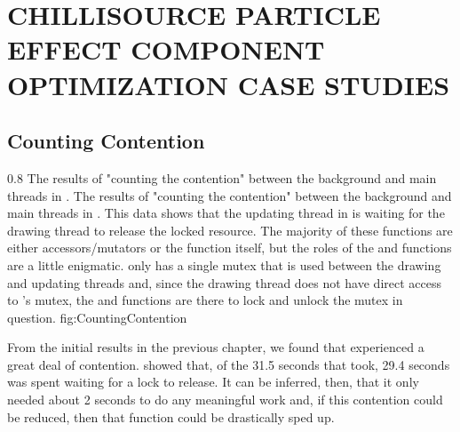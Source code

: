 

\chapter{CHILLISOURCE PARTICLE EFFECT COMPONENT OPTIMIZATION CASE STUDIES}\label{ch:case_studies}

\section{Counting Contention}\label{sec:studies_counting_contention}

{0.8}
{The results of "counting the contention" between the background and main threads in .}
{The results of "counting the contention" between the background and main threads in . This data shows that the updating thread in  is waiting for the drawing thread to release the locked resource. The majority of these functions are either accessors/mutators or the  function itself, but the roles of the  and  functions are a little enigmatic.  only has a single mutex that is used between the drawing and updating threads and, since the drawing thread does not have direct access to 's mutex, the  and  functions are there to lock and unlock the mutex in question.}
{fig:CountingContention}

From the initial results in the previous chapter, we found that  experienced a great deal of contention.  showed that, of the 31.5 seconds that  took, 29.4 seconds was spent waiting for a lock to release. It can be inferred, then, that it only needed about 2 seconds to do any meaningful work and, if this contention could be reduced, then that function could be drastically sped up. 

